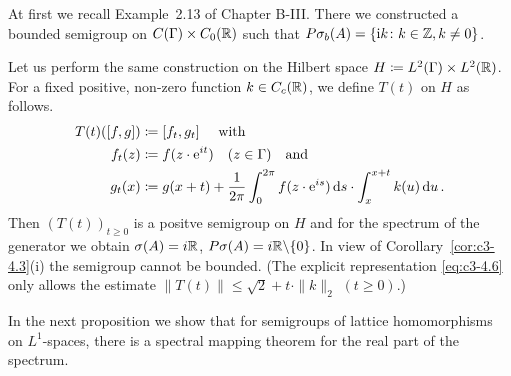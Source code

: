 \begin{example}\label{ex:c3-4.4}
	At first we recall Example~2.13 of Chapter B-III. 
	There we constructed a bounded semigroup on $C(\Gamma)\times C_{0}(\mathbb{R} )$ such that $P\sigma_{b}(A) = \{\mathrm{i} k \colon k \in \mathbb{Z}, k \neq 0\}$.

    Let us perform the same construction on the Hilbert space
    $H \coloneqq L^2(\Gamma)\times L^2(\mathbb{R} )$.
    For a fixed positive, non-zero function $k \in C_c(\mathbb{R} )$,
    we define $T(t)$ on $H$ as follows.
\begin{equation}\label{eq:c3-4.6}
	\begin{aligned} 
		T(t)([f,g]) &\coloneqq [f_t,g_t] \quad \ \text{with}\\
		f_t(z) &\coloneqq f(z \cdot \mathrm{e}^{it}) \quad (z \in \Gamma) \quad \text{and}\\
		g_t(x) &\coloneqq g(x+t) + \frac{1}{2\pi}\int_{0}^{2\pi} f(z \cdot \mathrm{e}^{is}) \mathop{}\!\mathrm{d}{s}  \cdot \int_{x}^{x+t} k(u) \mathop{}\!\mathrm{d}{u} \,.
	\end{aligned}
\end{equation}
Then $(T(t))_{t \geq 0}$ is a positve semigroup on $H$ and for the spectrum of
the generator we obtain $\sigma(A) = i\mathbb{R} $, $P\sigma(A) = i\mathbb{R} \backslash\{0\}$.
In view of Corollary~\ref{cor:c3-4.3}(i) the semigroup cannot be bounded.
(The explicit representation \eqref{eq:c3-4.6} only allows the estimate $\|T(t)\| \leq \sqrt{2} + t \cdot \|k\|_2$ $(t\geq 0)$.)
\end{example}

In the next proposition we show that for semigroups of lattice homomorphisms on $L^1$-spaces, there is a spectral mapping theorem for the
real part of the spectrum.

